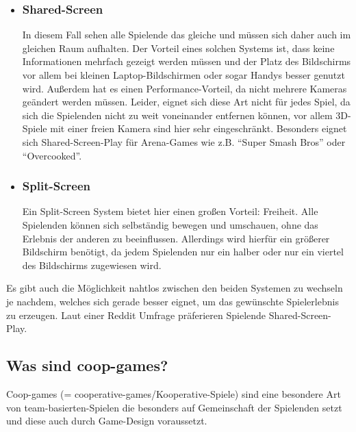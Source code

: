 \begin{itemize}
	
\item \subsubsection{Shared-Screen}

In diesem Fall sehen alle Spielende das gleiche und müssen sich daher auch im gleichen Raum aufhalten. Der Vorteil eines solchen Systems ist, dass keine Informationen mehrfach gezeigt werden müssen und der Platz des Bildschirms vor allem bei kleinen Laptop-Bildschirmen oder sogar Handys besser genutzt wird. Außerdem hat es einen Performance-Vorteil, da nicht mehrere Kameras geändert werden müssen. Leider, eignet sich diese Art nicht für jedes Spiel, da sich die Spielenden nicht zu weit voneinander entfernen können, vor allem 3D-Spiele mit einer freien Kamera sind hier sehr eingeschränkt. Besonders eignet sich Shared-Screen-Play für Arena-Games wie z.B. "`Super Smash Bros"' oder "`Overcooked"'.

\item \subsubsection{Split-Screen}

Ein Split-Screen System bietet hier einen großen Vorteil: Freiheit. Alle Spielenden können sich selbständig bewegen und umschauen, ohne das Erlebnis der anderen zu beeinflussen. Allerdings wird hierfür ein größerer Bildschirm benötigt, da jedem Spielenden nur ein halber oder nur ein viertel des Bildschirms zugewiesen wird.

\end{itemize}

\noindent Es gibt auch die Möglichkeit nahtlos zwischen den beiden Systemen zu wechseln je nachdem, welches sich gerade besser eignet, um das gewünschte Spielerlebnis zu erzeugen. Laut einer Reddit Umfrage präferieren Spielende Shared-Screen-Play\cite{_shared_or_splitscreen_preference}.

\subsection{Was sind coop-games?}

Coop-games (= cooperative-games/Kooperative-Spiele) sind eine besondere Art von team-basierten-Spielen die besonders auf Gemeinschaft der Spielenden setzt und diese auch durch Game-Design voraussetzt. 

